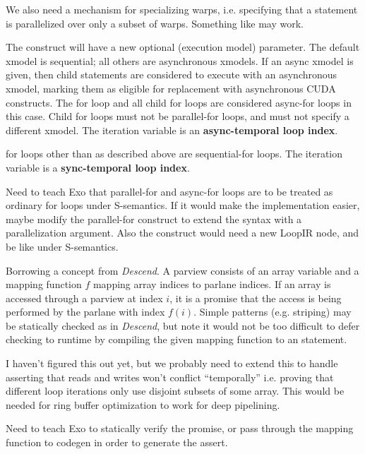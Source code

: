 \filbreak
We also need a mechanism for specializing warps, i.e. specifying that a  statement is parallelized over only a subset of warps.
Something like  may work.

\filbreak
{} The  construct will have a new optional  (execution model) parameter.
The default xmodel is sequential; all others are asynchronous xmodels.
If an async xmodel is given, then child statements are considered to execute with an asynchronous xmodel, marking them as eligible for replacement with asynchronous CUDA constructs.
The for loop and all child for loops are considered async-for loops in this case.
Child for loops must not be parallel-for loops, and must not specify a different xmodel.
The iteration variable is an \textbf{async-temporal loop index}.

\filbreak
{} for loops other than as described above are sequential-for loops.
The iteration variable is a \textbf{sync-temporal loop index}.

 Need to teach Exo that parallel-for and async-for loops are to be treated as ordinary for loops under S-semantics.
If it would make the implementation easier, maybe modify the parallel-for construct to extend the  syntax with a parallelization argument.
Also the  construct would need a new LoopIR node, and be like  under S-semantics.

\filbreak
{} Borrowing a concept from \textit{Descend}.
A parview consists of an array variable and a mapping function $f$ mapping array indices to parlane indices.
If an array is accessed through a parview at index $i$, it is a promise that the access is being performed by the parlane with index $f(i)$.
Simple patterns (e.g. striping) may be statically checked as in \textit{Descend}, but note it would not be too difficult to defer checking to runtime by compiling the given mapping function to an  statement.

I haven't figured this out yet, but we probably need to extend this to handle asserting that reads and writes won't conflict ``temporally'' i.e. proving that different loop iterations only use disjoint subsets of some array.
This would be needed for ring buffer optimization to work for deep pipelining.

 Need to teach Exo to statically verify the promise, or pass through the mapping function to codegen in order to generate the assert.

